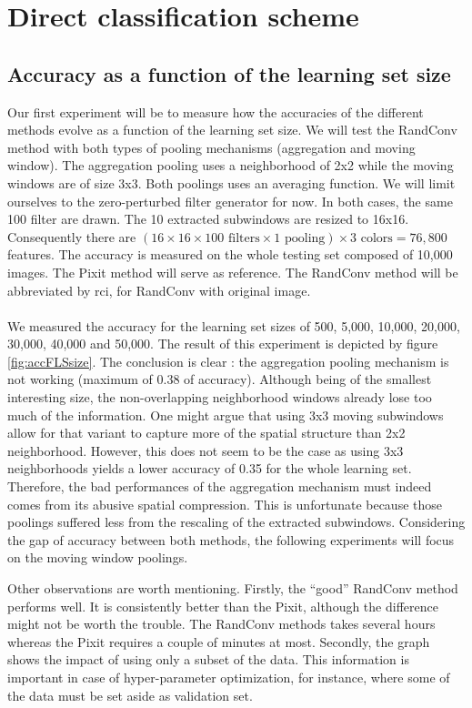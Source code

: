 \documentclass[a4paper]{report}
\begin{document}
	\section{Direct classification scheme}
	
		\subsection{Accuracy as a function of the learning set size}
		Our first experiment will be to measure how the accuracies of the different methods evolve as a function of the learning set size. We will test the RandConv method with both types of pooling mechanisms (aggregation and moving window). The aggregation pooling uses a neighborhood of 2x2 while the moving windows are of size 3x3. Both poolings uses an averaging function. We will limit ourselves to the zero-perturbed filter generator for now. In both cases, the same 100 filter are drawn. The 10 extracted subwindows are resized to 16x16. Consequently there are $(16 \times 16 \times 100 \text{ filters} \times 1 \text{ pooling})\times 3 \text{ colors} = 76,800$ features. The accuracy is measured on the whole testing set composed of 10,000 images. The Pixit method will serve as reference. The RandConv method will be abbreviated by rci, for RandConv with original image.
		\paragraph{}
		We measured the accuracy for the learning set sizes of 500, 5,000, 10,000, 20,000, 30,000, 40,000 and 50,000. The result of this experiment is depicted by figure \ref{fig:accFLSsize}. The conclusion is clear : the aggregation pooling mechanism is not working (maximum of 0.38 of accuracy). Although being of the smallest interesting size, the non-overlapping neighborhood windows already lose too much of the information. One might argue that using 3x3 moving subwindows allow for that variant to capture more of the spatial structure than 2x2 neighborhood. However, this does not seem to be the case as using 3x3 neighborhoods yields a lower accuracy of 0.35 for the whole learning set. Therefore, the bad performances of the aggregation mechanism must indeed comes from its abusive spatial compression. This is unfortunate because those poolings suffered less from the rescaling of the extracted subwindows. Considering the gap of accuracy between both methods, the following experiments will focus on the moving window poolings.
		\par
		Other observations are worth mentioning. Firstly, the ``good'' RandConv method performs well. It is consistently better than the Pixit, although the difference might not be worth the trouble. The RandConv methods takes several hours whereas the Pixit requires a couple of minutes at most. 
		Secondly, the graph shows the impact of using only a subset of the data. This information is important in case of hyper-parameter optimization, for instance, where some of the data must be set aside as validation set.
		
\end{document}

